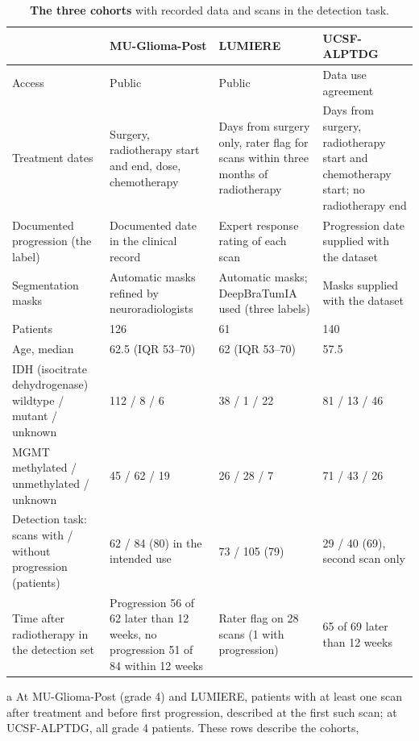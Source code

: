 \documentclass[largeformat]{interact} %
\begin{document}
\begin{table}[!htbp]
\centering
\caption[The three cohorts]{\textbf{The three cohorts} with recorded data and scans in the detection task.}
\label{tab:1}
\begin{threeparttable}
\footnotesize
\zebrarows
\begin{tabularx}{\linewidth}{@{}R{3.3cm}LLL@{}}
\toprule
 & MU-Glioma-Post & LUMIERE & UCSF-ALPTDG \\
\midrule
Access & Public & Public & Data use agreement \\
Treatment dates & Surgery, radiotherapy start and end, dose, chemotherapy & Days from surgery only, rater flag for scans within three months of radiotherapy & Days from surgery, radiotherapy start and chemotherapy start; no radiotherapy end \\
Documented progression (the label) & Documented date in the clinical record & Expert response rating of each scan & Progression date supplied with the dataset \\
Segmentation masks & Automatic masks refined by neuroradiologists \citep{mahmoud2025} & Automatic masks; DeepBraTumIA used (three labels) \citep{suter2022} & Masks supplied with the dataset \\
\addlinespace
Patients & 126 & 61 & 140 \\
Age, median & 62.5 (IQR 53--70) & 62 (IQR 53--70) & 57.5 \\
IDH (isocitrate dehydrogenase) wildtype / mutant / unknown & 112 / 8 / 6 & 38 / 1 / 22 & 81 / 13 / 46 \\
MGMT methylated / unmethylated / unknown & 45 / 62 / 19 & 26 / 28 / 7 & 71 / 43 / 26 \\
\addlinespace
Detection task: scans with / without progression (patients) & 62 / 84 (80) in the intended use & 73 / 105 (79) & 29 / 40 (69), second scan only \\
Time after radiotherapy in the detection set & Progression 56 of 62 later than 12 weeks, no progression 51 of 84 within 12 weeks & Rater flag on 28 scans (1 with progression) & 65 of 69 later than 12 weeks \\
\bottomrule
\end{tabularx}
\begin{tablenotes}\footnotesize
\item[a] At MU-Glioma-Post (grade 4) and LUMIERE, patients with at least one scan after treatment and before first
progression, described at the first such scan; at UCSF-ALPTDG, all grade 4 patients. These rows describe the cohorts,

\end{tablenotes}
\end{threeparttable}
\end{table}
\end{document}

